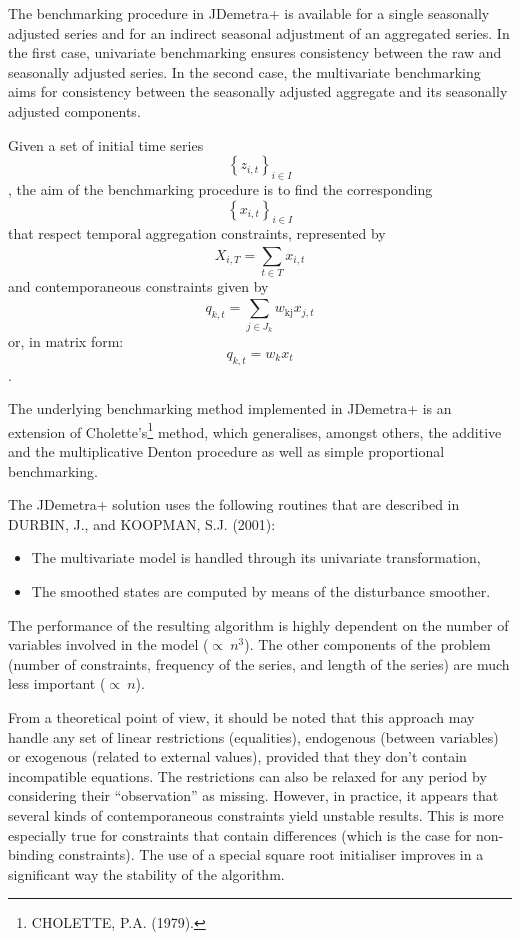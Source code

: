 \documentclass[
  letterpaper,
  DIV=11,
  numbers=noendperiod]{scrreprt}
\begin{document}
The benchmarking procedure in JDemetra+ is available for a single
seasonally adjusted series and for an indirect seasonal adjustment of an
aggregated series. In the first case, univariate benchmarking ensures
consistency between the raw and seasonally adjusted series. In the
second case, the multivariate benchmarking aims for consistency between
the seasonally adjusted aggregate and its seasonally adjusted
components.

Given a set of initial time series
\[\left\{ z_{i,t} \right\}_{i \in I}\], the aim of the benchmarking
procedure is to find the corresponding
\[\left\{ x_{i,t} \right\}_{i \in I}\] that respect temporal aggregation
constraints, represented by \[X_{i,T} = \sum_{t \in T}^{}x_{i,t}\] and
contemporaneous constraints given by
\[q_{k,t} = \sum_{j \in J_{k}}^{}{w_{\text{kj}}x_{j,t}}\] or, in matrix
form: \[q_{k,t} = w_{k}x_{t}\].

The underlying benchmarking method implemented in JDemetra+ is an
extension of Cholette's\footnote{CHOLETTE, P.A. (1979).} method, which
generalises, amongst others, the additive and the multiplicative Denton
procedure as well as simple proportional benchmarking.

The JDemetra+ solution uses the following routines that are described in
DURBIN, J., and KOOPMAN, S.J. (2001):

\begin{itemize}
\item
  The multivariate model is handled through its univariate
  transformation,
\item
  The smoothed states are computed by means of the disturbance smoother.
\end{itemize}

The performance of the resulting algorithm is highly dependent on the
number of variables involved in the model (\(\propto \ n^{3}\)). The
other components of the problem (number of constraints, frequency of the
series, and length of the series) are much less important
(\(\propto \ n\)).

From a theoretical point of view, it should be noted that this approach
may handle any set of linear restrictions (equalities), endogenous
(between variables) or exogenous (related to external values), provided
that they don't contain incompatible equations. The restrictions can
also be relaxed for any period by considering their ``observation'' as
missing. However, in practice, it appears that several kinds of
contemporaneous constraints yield unstable results. This is more
especially true for constraints that contain differences (which is the
case for non-binding constraints). The use of a special square root
initialiser improves in a significant way the stability of the
algorithm.
\end{document}
